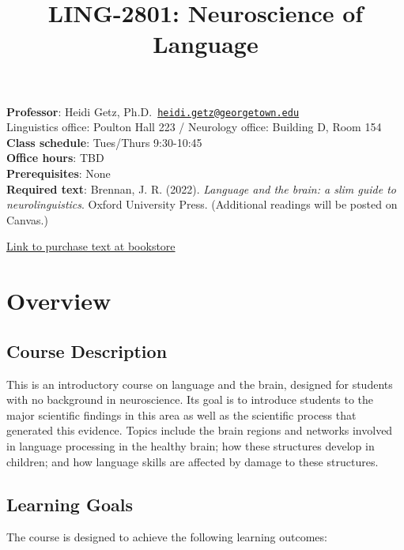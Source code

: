 \documentclass[
  letterpaper,
  DIV=11,
  numbers=noendperiod]{scrartcl}
\title{LING-2801: Neuroscience of Language}
\author{}
\date{}
\begin{document}
\maketitle


\textbf{Professor}: Heidi Getz,
Ph.D.~\href{mailto:heidi.getz@georgetown.edu}{\nolinkurl{heidi.getz@georgetown.edu}}\\
Linguistics office: Poulton Hall 223 / Neurology office: Building D,
Room 154\\
\textbf{Class schedule}: Tues/Thurs 9:30-10:45\\
\textbf{Office hours}: TBD\\
\textbf{Prerequisites}: None\\
\textbf{Required text}: Brennan, J. R. (2022). \emph{Language and the
brain: a slim guide to neurolinguistics}. Oxford University Press.
(Additional readings will be posted on Canvas.)

\href{https://georgetown.bncollege.com/course-material-listing-page?utm_campaign=storeId=88131_langId=-1_courseData=LING_2801_01_F26&utm_source=wcs&utm_medium=registration_integration}{Link
to purchase text at bookstore}

\section{\texorpdfstring{\textbf{Overview}}{Overview}}\label{overview}

\subsection{\texorpdfstring{\textbf{Course
Description}}{Course Description}}\label{course-description}

This is an introductory course on language and the brain, designed for
students with no background in neuroscience. Its goal is to introduce
students to the major scientific findings in this area as well as the
scientific process that generated this evidence. Topics include the
brain regions and networks involved in language processing in the
healthy brain; how these structures develop in children; and how
language skills are affected by damage to these structures.

\subsection{\texorpdfstring{\textbf{Learning
Goals}}{Learning Goals}}\label{learning-goals}

The course is designed to achieve the following learning outcomes:
\end{document}
